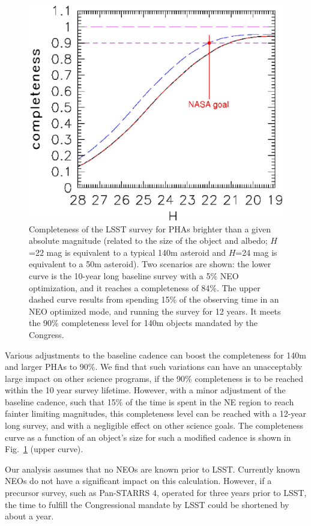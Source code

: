 \documentclass{emulateapj}
\begin{document}
\begin{figure}
\includegraphics[width=1.0\hsize,clip]{Cneo.ps}
\caption{Completeness of the LSST survey for PHAs brighter than a given absolute
magnitude (related to the size of the object and albedo; 
$H$=22 mag is equivalent to a typical 140m asteroid and $H$=24 mag is
equivalent to a 50m asteroid). Two scenarios are shown: the lower curve is the 
10-year long baseline survey with a 5\% NEO optimization, and it reaches a 
completeness of 84\%. The upper dashed curve results from spending 15\% of the 
observing time in an NEO optimized mode, and running the survey for 12 years.  
It meets the 90\% completeness level for 140m objects mandated by the Congress.} 
\label{Fig:Cneo}
\end{figure}

Various adjustments to the baseline cadence can boost the completeness for
140m and larger PHAs to 90\%. We find that such variations can have an unacceptably 
large impact on other science programs, if the 90\% completeness is to be reached 
within the 10 year survey lifetime. However, with a minor adjustment of the 
baseline cadence, such that 15\% of the time is spent in the NE region to reach
fainter limiting magnitudes, this completeness level can be reached with a 12-year 
long survey, and with a negligible effect on other science goals. The completeness 
curve as a function of an object's size for such a modified cadence is shown in 
Fig.~\ref{Fig:Cneo} (upper curve).

Our analysis assumes that no NEOs are known prior to LSST. Currently known
NEOs do not have a significant impact on this calculation. However, if a precursor 
survey, such as Pan-STARRS 4, operated for three years prior to LSST, the time to
fulfill the Congressional mandate by LSST could be shortened by about a year.
\end{document}
